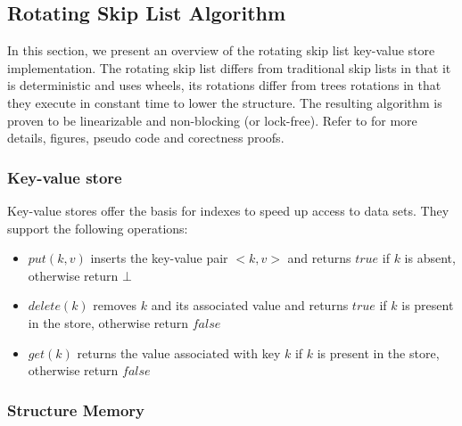 \documentclass{article}
\begin{document}
\subsection{Rotating Skip List Algorithm}
\label{ssec:trsl}

In this section, we present an overview of the rotating skip list key-value store implementation. The rotating skip list differs from traditional skip lists in that it is deterministic and uses wheels, its rotations differ from trees rotations in that they execute in constant time to lower the structure. The resulting algorithm is proven to be linearizable and non-blocking (or lock-free). Refer to \cite{C1} for more details, figures, pseudo code and corectness proofs.

\subsubsection{Key-value store}
\label{ssec:ksv}

Key-value stores offer the basis for indexes to speed up access to data sets. They support the following operations:
\begin{itemize}
	\item  $put(k,v)$ inserts the key-value pair $<k, v>$ and returns $true$ if $k$ is absent, otherwise return $\bot$
	\item  $delete(k)$ removes $k$ and its associated value and returns $true$ if $k$ is present in the store, otherwise return $false$ 
	\item  $get(k)$ returns the value associated with key $k$ if $k$ is present in the store, otherwise return $false$
\end{itemize}

\subsubsection{Structure Memory}
\label{ssec:sm}
\end{document}
